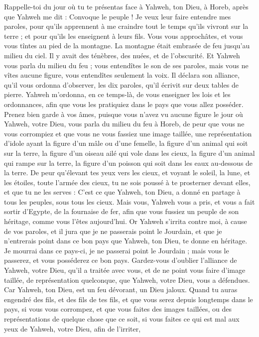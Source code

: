\begin{multicols}{2}
Rappelle-toi du jour où tu te présentas face à Yahweh, ton Dieu, à Horeb, après que Yahweh me dit : Convoque le peuple ! Je veux leur faire entendre mes paroles, pour qu’ils apprennent à me craindre tout le temps qu'ils vivront sur la terre ; et pour qu’ils les enseignent à leurs fils.
Vous vous approchâtes, et vous vous tîntes au pied de la montagne. La montagne était embrasée de feu jusqu'au milieu du ciel. Il y avait des ténèbres, des nuées, et de l’obscurité.
Et Yahweh vous parla du milieu du feu ; vous entendîtes le son de ses paroles, mais vous ne vîtes aucune figure, vous entendîtes seulement la voix.
Il déclara son alliance, qu’il vous ordonna d'observer, les dix paroles, qu'il écrivit sur deux tables de pierre.
Yahweh m’ordonna, en ce temps-là, de vous enseigner les lois et les ordonnances, afin que vous les pratiquiez dans le pays que vous allez posséder.
Prenez bien garde à vos âmes, puisque vous n'avez vu aucune figure le jour où Yahweh, votre Dieu, vous parla du milieu du feu à Horeb,
de peur que vous ne vous corrompiez et que vous ne vous fassiez une image taillée, une représentation d’idole ayant la figure d'un mâle ou d'une femelle,
la figure d’un animal qui soit sur la terre, la figure d'un oiseau ailé qui vole dans les cieux,
la figure d’un animal qui rampe sur la terre, la figure d’un poisson qui soit dans les eaux au-dessous de la terre.
De peur qu’élevant tes yeux vers les cieux, et voyant le soleil, la lune, et les étoiles, toute l'armée des cieux, tu ne sois poussé à te prosterner devant elles, et que tu ne les serves : C’est ce que Yahweh, ton Dieu, a donné en partage à tous les peuples, sous tous les cieux.
Mais vous, Yahweh vous a pris, et vous a fait sortir d'Egypte, de la fournaise de fer, afin que vous fussiez un peuple de son héritage, comme vous l’êtes aujourd'hui.
Or Yahweh s’irrita contre moi, à cause de vos paroles, et il jura que je ne passerais point le Jourdain, et que je n'entrerais point dans ce bon pays que Yahweh, ton Dieu, te donne en héritage.
Je mourrai dans ce pays-ci, je ne passerai point le Jourdain ; mais vous le passerez, et vous posséderez ce bon pays.
Gardez-vous d’oublier l'alliance de Yahweh, votre Dieu, qu’il a traitée avec vous, et de ne point vous faire d’image taillée, de représentation quelconque, que Yahweh, votre Dieu, vous a défendues.
Car Yahweh, ton Dieu, est un feu dévorant\FTNT{}, un Dieu jaloux.
Quand tu auras engendré des fils, et des fils de tes fils, et que vous serez depuis longtemps dans le pays, si vous vous corrompez, et que vous faites des images taillées, ou des représentations de quelque chose que ce soit, si vous faites ce qui est mal aux yeux de Yahweh, votre Dieu, afin de l'irriter,

\end{multicols}
